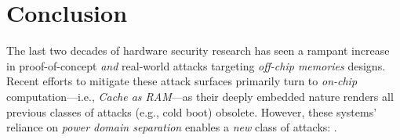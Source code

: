 \newcommand{\verygood}{ 
\begin{tikzpicture}
    \filldraw[fill = white, draw =red] (0,0) circle (3pt);
   \fill[red] (0,0) -- (180:3pt) arc (180:0:3pt) -- cycle;
\end{tikzpicture}
     }
     
\newcommand{\excl}{ 
\begin{tikzpicture}
    \filldraw [red] (0,0) circle (3pt);
    \filldraw [white] (0,0) circle (1pt);
\end{tikzpicture}
     }     










\renewcommand{\algorithmicrequire}{\textbf{Input:}}
\renewcommand{\algorithmicensure}{\textbf{Output Reg:}}







\newcommand{\minusWhiteSpace}{\vspace{0pt}}






\section{Conclusion}
\label{sec_conclusion}



The last two decades of hardware security research has seen a rampant increase in proof-of-concept \emph{and} real-world attacks targeting \emph{off-chip memories} designs.
Recent efforts to mitigate these attack surfaces primarily turn to \emph{on-chip} computation---i.e., \emph{Cache as RAM}\cite{zhang2016case}---as their deeply embedded nature renders all previous classes of attacks (e.g., cold boot\cite{halderman2009lest}) obsolete. However, these systems' reliance on \emph{power domain separation} enables a \emph{new} class of attacks: \sys{}.

